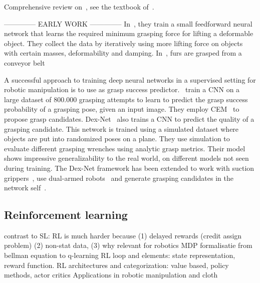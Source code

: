 \documentclass[\home/main.tex]{subfiles}
\begin{document}
Comprehensive review on~, see the textbook of~\textcite{Goodfellow2016}.

--------------
EARLY WORK
--------------
In~\autocite{Howard2000}, they train a small feedforward neural network that learns the required minimum grasping force for lifting a deformable object. They collect the data by iteratively using more lifting force on objects with certain masses, deformability and damping.
In~\autocite{Foresti2004}, furs are grasped from a conveyor belt 

A successful approach to training deep neural networks in a supervised setting for robotic manipulation is to use  as grasp success predictor.~\textcite{Levine2016} train a \acrshort{CNN} on a large dataset of $800.000$ grasping attempts to learn to predict the grasp success probability of a grasping pose, given an input image. They employ CEM~\autocite{CEM} to propose grasp candidates. Dex-Net~\autocite{dexnet2} also trains a \acrshort{CNN} to predict the quality of a grasping candidate. This network is trained using a simulated dataset where objects are put into randomized poses on a plane. They use simulation to evaluate different grasping wrenches using analytic grasp metrics. Their model shows impressive generalizability to the real world, on different models not seen during training. The Dex-Net framework has been extended to work with suction grippers~\autocite{dexnet3}, use dual-armed robots~\autocite{dexnet4} and generate grasping candidates in the network self~\autocite{Satish2019}.


\subsection{Reinforcement learning} \label{subsec:lit_rl}
contrast to SL: RL is much harder because (1) delayed rewards (credit assign problem) (2) non-stat data, (3) 
why relevant for robotics
MDP formalisatie
from bellman equation to q-learning 
RL loop and elements: state representation, reward function. 
RL architectures and categorization: value based, policy methods, actor critics 
Applications in robotic manipulation and cloth 
\end{document}
